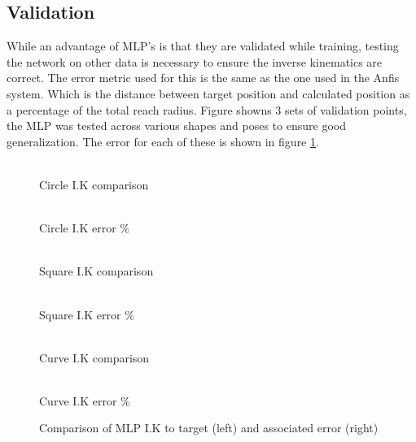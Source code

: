 \documentclass[a4paper,11pt]{article}
\begin{document}
\subsection{Validation}
While an advantage of MLP's is that they are validated while training, testing the network on other data is necessary to ensure the inverse kinematics are correct.
The error metric used for this is the same as the one used in the Anfis system. Which is the distance between target position and calculated position as a percentage of the total reach radius.
Figure showns 3 sets of validation points, the MLP was tested across various shapes and poses to ensure good generalization. The error for each of these is shown in figure \ref{fig:MLP}.
\begin{figure}[H]

\begin{minipage}{.5\linewidth}
\centering
{}\\{Circle I.K comparison}
\end{minipage}
\begin{minipage}{.5\linewidth}
\centering
{}\\{Circle I.K error \%}

\end{minipage}\par\medskip

\begin{minipage}{.5\linewidth}
\centering
{}\\{Square I.K comparison}

\end{minipage}
\begin{minipage}{.5\linewidth}
\centering
{}\\{Square I.K error \%}

\end{minipage}\par\medskip

\begin{minipage}{.5\linewidth}
\centering
{}\\{Curve I.K comparison}

\end{minipage}
\begin{minipage}{.5\linewidth}
\centering
{}\\{Curve I.K error \%}

\end{minipage}
\caption{Comparison of MLP I.K to target (left) and associated error (right)}
\label{fig:MLP}
\end{figure}
\end{document}
